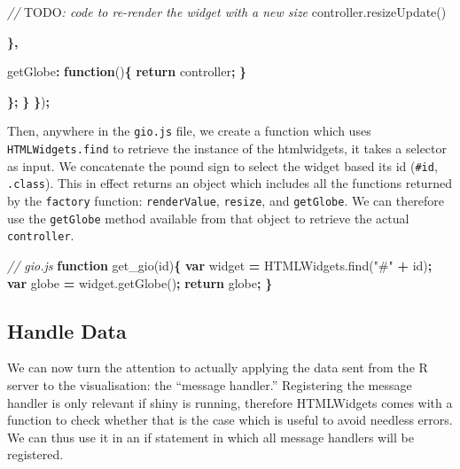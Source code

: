 \documentclass[
]{krantz}
\makeatletter
\newenvironment{Shaded}{\begin{snugshade}}{\end{snugshade}}
\newcommand{\AlertTok}[1]{\textcolor[rgb]{0.33,0.33,0.33}{#1}}
\newcommand{\AttributeTok}[1]{\textcolor[rgb]{0.61,0.61,0.61}{#1}}
\newcommand{\CommentTok}[1]{\textcolor[rgb]{0.37,0.37,0.37}{\textit{#1}}}
\newcommand{\ControlFlowTok}[1]{\textcolor[rgb]{0.27,0.27,0.27}{\textbf{#1}}}
\newcommand{\DataTypeTok}[1]{\textcolor[rgb]{0.27,0.27,0.27}{#1}}
\newcommand{\KeywordTok}[1]{\textcolor[rgb]{0.27,0.27,0.27}{\textbf{#1}}}
\newcommand{\NormalTok}[1]{#1}
\newcommand{\OperatorTok}[1]{\textcolor[rgb]{0.43,0.43,0.43}{\textbf{#1}}}
\newcommand{\StringTok}[1]{\textcolor[rgb]{0.5,0.5,0.5}{#1}}
\newcommand{\VariableTok}[1]{\textcolor[rgb]{0,0,0}{#1}}
\newenvironment{kframe}{%
\medskip{}
\setlength{\fboxsep}{.8em}
 \def\at@end@of@kframe{}%
 \ifinner\ifhmode%
  \def\at@end@of@kframe{\end{minipage}}%
  \begin{minipage}{\columnwidth}%
 \fi\fi%
 \def\FrameCommand##1{\hskip\@totalleftmargin \hskip-\fboxsep
 \colorbox{shadecolor}{##1}\hskip-\fboxsep
     \hskip-\linewidth \hskip-\@totalleftmargin \hskip\columnwidth}%
 \MakeFramed {\advance\hsize-\width
   \@totalleftmargin\z@ \linewidth\hsize
   \@setminipage}}%
 {\par\unskip\endMakeFramed%
 \at@end@of@kframe}
\renewenvironment{Shaded}{\begin{kframe}}{\end{kframe}}
\makeatother
\begin{document}
\begin{Shaded}
\begin{Highlighting}[]
        \CommentTok{// }\AlertTok{TODO}\CommentTok{: code to re{-}render the widget with a new size}
        \VariableTok{controller}\NormalTok{.}\AttributeTok{resizeUpdate}\NormalTok{()}

      \OperatorTok{\},}

      \DataTypeTok{getGlobe}\OperatorTok{:} \KeywordTok{function}\NormalTok{()}\OperatorTok{\{}
        \ControlFlowTok{return}\NormalTok{ controller}\OperatorTok{;}
      \OperatorTok{\}}

    \OperatorTok{\};}
  \OperatorTok{\}}
\OperatorTok{\}}\NormalTok{)}\OperatorTok{;}
\end{Highlighting}
\end{Shaded}

Then, anywhere in the \texttt{gio.js} file, we create a function which uses \texttt{HTMLWidgets.find} to retrieve the instance of the htmlwidgets, it takes a selector as input. We concatenate the pound sign to select the widget based its id (\texttt{\#id}, \texttt{.class}). This in effect returns an object which includes all the functions returned by the \texttt{factory} function: \texttt{renderValue}, \texttt{resize}, and \texttt{getGlobe}. We can therefore use the \texttt{getGlobe} method available from that object to retrieve the actual \texttt{controller}.

\begin{Shaded}
\begin{Highlighting}[]
\CommentTok{// gio.js}
\KeywordTok{function} \AttributeTok{get\_gio}\NormalTok{(id)}\OperatorTok{\{}
  \KeywordTok{var}\NormalTok{ widget }\OperatorTok{=} \VariableTok{HTMLWidgets}\NormalTok{.}\AttributeTok{find}\NormalTok{(}\StringTok{"\#"} \OperatorTok{+}\NormalTok{ id)}\OperatorTok{;}
  \KeywordTok{var}\NormalTok{ globe }\OperatorTok{=} \VariableTok{widget}\NormalTok{.}\AttributeTok{getGlobe}\NormalTok{()}\OperatorTok{;}
  \ControlFlowTok{return}\NormalTok{ globe}\OperatorTok{;}
\OperatorTok{\}}
\end{Highlighting}
\end{Shaded}

\hypertarget{handle-data}{%
\subsection{Handle Data}\label{handle-data}}

We can now turn the attention to actually applying the data sent from the R server to the visualisation: the ``message handler.'' Registering the message handler is only relevant if shiny is running, therefore HTMLWidgets comes with a function to check whether that is the case which is useful to avoid needless errors. We can thus use it in an if statement in which all message handlers will be registered.
\end{document}

